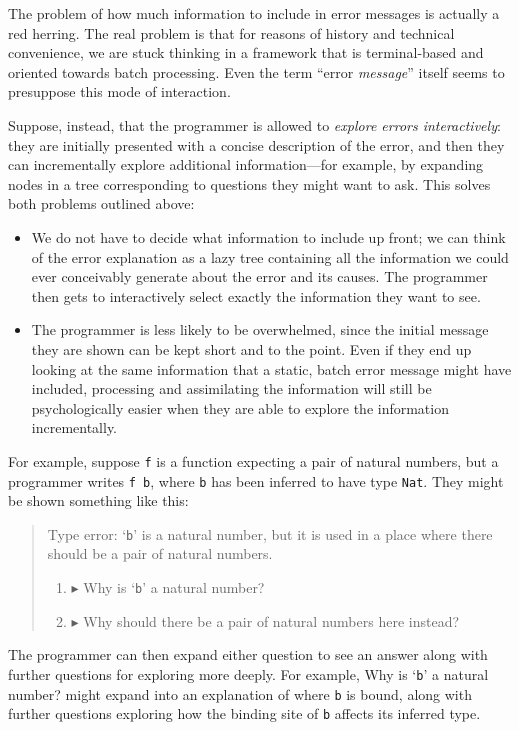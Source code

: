 \documentclass[sigplan, screen]{acmart}\settopmatter{printccs=false,printacmref=false}
\begin{document}
The problem of how much information to include in error messages is
actually a red herring.  The real problem is that for reasons of
history and technical convenience, we are stuck thinking in a
framework that is terminal-based and oriented towards batch
processing.  Even the term ``error \emph{message}'' itself seems to
presuppose this mode of interaction.

Suppose, instead, that the programmer is allowed to \emph{explore errors
  interactively}: they are initially presented with a concise
description of the error, and then they can incrementally explore
additional information---for example, by expanding nodes in a tree
corresponding to questions they might want to ask.  This solves both
problems outlined above:
\begin{itemize}
\item We do not have to decide what information to include up front;
  we can think of the error explanation as a lazy tree containing all
  the information we could ever conceivably generate about the error
  and its causes.  The programmer then gets to interactively select
  exactly the information they want to see.
\item The programmer is less likely to be overwhelmed, since the
  initial message they are shown can be kept short and to the point.
  Even if they end up looking at the same information that a static,
  batch error message might have included, processing and assimilating
  the information will still be psychologically easier when they
  are able to explore the information incrementally.
\end{itemize}

\newenvironment{discomsg}{\begin{quote}\sffamily}{\end{quote}}
\newcommand{\discoq}{\item[$\blacktriangleright$]}
\newcommand{\discoqa}{\item[$\blacktriangledown$]}

For example, suppose \verb|f| is a function expecting a pair of
natural numbers, but a programmer writes \verb|f b|, where \verb|b|
has been inferred to have type \verb|Nat|.  They might be shown
something like this:
\begin{discomsg}
  Type error: `\verb|b|' is a natural number, but it is used in a
  place where there should be a pair of natural numbers.
  \begin{enumerate}
    \discoq Why is `\verb|b|' a natural number?
    \discoq Why should there be a pair of natural numbers here instead?
  \end{enumerate}
\end{discomsg}
The programmer can then expand either question to see an answer along
with further questions for exploring more deeply.  For example,
{\sffamily Why is `\verb|b|' a natural number?} might expand into an
explanation of where \verb|b| is bound, along with further questions
exploring how the binding site of \verb|b| affects its inferred type.
\end{document}
